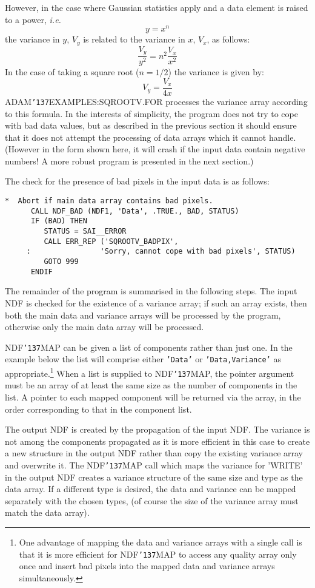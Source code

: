 \documentclass[twoside,11pt]{article}
\renewcommand{\_}{{\tt\char'137}}
\begin{document}
However,  in the case where Gaussian statistics apply and
a data element is raised to a power, {\it i.e.}
$$ y=x^n$$
the variance in $y$, $V_y$ is related to the variance in $x$, $V_x$, as 
follows:
$$\frac{V_y}{y^2}=n^2\frac{V_x}{x^2}$$
In the case of taking a square root ($n=1/2$) the variance 
is given by:
$$V_y=\frac{V_x}{4x}$$
ADAM\_EXAMPLES:SQROOTV.FOR processes the variance array
according to this formula.
In the interests of simplicity, the program does not try to cope
with bad data values, but as described in 
the previous section it should ensure that it does not attempt the
processing of data arrays which it cannot handle.
(However in the form shown here, it will crash if the input data contain
negative numbers! A more robust program is presented in the next section.)

The check for the presence of bad pixels in the input data is as follows:
\begin{verbatim}
*  Abort if main data array contains bad pixels.
      CALL NDF_BAD (NDF1, 'Data', .TRUE., BAD, STATUS)
      IF (BAD) THEN
         STATUS = SAI__ERROR
         CALL ERR_REP ('SQROOTV_BADPIX',
     :                'Sorry, cannot cope with bad pixels', STATUS)
         GOTO 999
      ENDIF      
\end{verbatim}
The remainder of the program is summarised in the following steps.
The input NDF is checked for the existence of a variance array;
if such an array exists, then both the main data and variance
arrays will be processed by the program, otherwise only the 
main data array  will be processed.

NDF\_MAP can be given a list of components rather than just one. 
In the example below the list will comprise either {\tt 'Data'} or 
{\tt 'Data,Variance'} as 
appropriate.\footnote{One advantage of mapping the data and variance arrays with 
a single call is that it is more efficient for NDF\_MAP to access any quality
array only once and insert bad pixels into the mapped data and variance arrays
simultaneously.}
When a list is supplied to NDF\_MAP, the pointer argument must be an array
of at least the same size as the number of components in the list.
A pointer to each mapped component will be returned via the array, in the
order corresponding to that in the component list.

The output NDF is created by the propagation of the input NDF.
The variance is not among the components propagated as it is more efficient
in this case to create a new structure in the output NDF rather 
than copy the existing variance array and overwrite it.
The NDF\_MAP call which maps the 
variance for 'WRITE' in the output NDF creates a variance structure 
of the same size and type as the data array.
If a different type is desired, the data and variance can be mapped
separately with the chosen types, (of course the size of the variance array 
must  match the data array).
\end{document}
